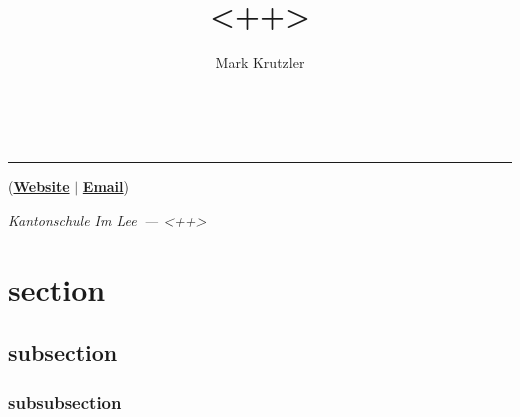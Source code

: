 \documentclass{article}
\title{<++>}
\author{Mark Krutzler}
\makeatletter
\newcommand{\thesubtitle}{<++>}
\newcommand{\currentdate}{<++>}
\newcommand{\auemail}{mark.krutzler@icloud.com}
\newcommand{\auwebsite}{https://krutzler.xyz}
\newcommand{\auinstitution}{Kantonschule Im Lee}
\renewcommand{\maketitle}{
\begin{center}
{\Huge\bfseries
\thetitle}
\vspace{0.5em}\\
{\LARGE\thesubtitle}


{\rule{0.4\textwidth}{.4pt}}

{\bfseries \theauthor} (\href{\auwebsite}{\bfseries Website} $\vert$ \href{mailto:\auemail}{\bfseries Email})

\textit{\auinstitution \ --- \currentdate}
\end{center}
}
\makeatother
\begin{document}
\maketitle

\section{section}

\subsection{subsection}

\subsubsection{subsubsection}
\end{document}
